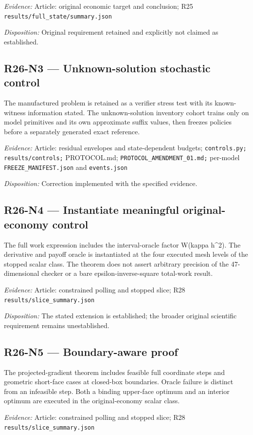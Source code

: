 \emph{Evidence:} Article: original economic target and conclusion; R25 \nolinkurl{results/full_state/summary.json}

\emph{Disposition:} Original requirement retained and explicitly not claimed as established.
\subsection{R26-N3 --- Unknown-solution stochastic control}
The manufactured problem is retained as a verifier stress test with its known-witness information stated. The unknown-solution inventory cohort trains only on model primitives and its own approximate suffix values, then freezes policies before a separately generated exact reference.

\emph{Evidence:} Article: residual envelopes and state-dependent budgets; \nolinkurl{controls.py;} \nolinkurl{results/controls;} PROTOCOL.md; \nolinkurl{PROTOCOL_AMENDMENT_01.md;} per-model \nolinkurl{FREEZE_MANIFEST.json} and \nolinkurl{events.json}

\emph{Disposition:} Correction implemented with the specified evidence.
\subsection{R26-N4 --- Instantiate meaningful original-economy control}
The full work expression includes the interval-oracle factor W(kappa h\textasciicircum{}2). The derivative and payoff oracle is instantiated at the four executed mesh levels of the stopped scalar class. The theorem does not assert arbitrary precision of the 47-dimensional checker or a bare epsilon-inverse-square total-work result.

\emph{Evidence:} Article: constrained polling and stopped slice; R28 \nolinkurl{results/slice_summary.json}

\emph{Disposition:} The stated extension is established; the broader original scientific requirement remains unestablished.
\subsection{R26-N5 --- Boundary-aware proof}
The projected-gradient theorem includes feasible full coordinate steps and geometric short-face cases at closed-box boundaries. Oracle failure is distinct from an infeasible step. Both a binding upper-face optimum and an interior optimum are executed in the original-economy scalar class.

\emph{Evidence:} Article: constrained polling and stopped slice; R28 \nolinkurl{results/slice_summary.json}


